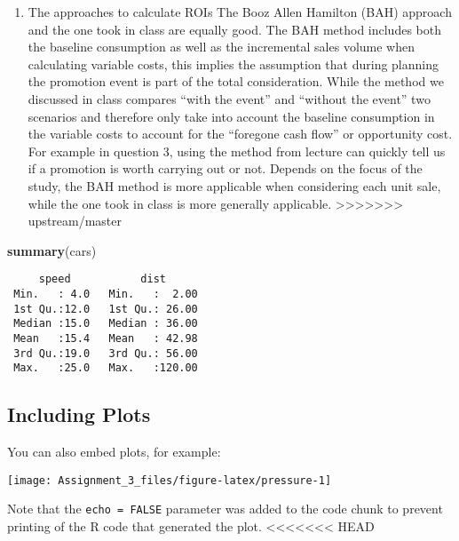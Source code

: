 \documentclass[]{article}
\newenvironment{Shaded}{\begin{snugshade}}{\end{snugshade}}
\newcommand{\KeywordTok}[1]{\textcolor[rgb]{0.13,0.29,0.53}{\textbf{#1}}}
\newcommand{\NormalTok}[1]{#1}
\providecommand{\tightlist}{%
  \setlength{\itemsep}{0pt}\setlength{\parskip}{0pt}}
\begin{document}
\begin{enumerate}
\def\labelenumi{\arabic{enumi}.}
\setcounter{enumi}{4}
\tightlist
\item
  The approaches to calculate ROIs The Booz Allen Hamilton (BAH)
  approach and the one took in class are equally good. The BAH method
  includes both the baseline consumption as well as the incremental
  sales volume when calculating variable costs, this implies the
  assumption that during planning the promotion event is part of the
  total consideration. While the method we discussed in class compares
  ``with the event'' and ``without the event'' two scenarios and
  therefore only take into account the baseline consumption in the
  variable costs to account for the ``foregone cash flow'' or
  opportunity cost. For example in question 3, using the method from
  lecture can quickly tell us if a promotion is worth carrying out or
  not. Depends on the focus of the study, the BAH method is more
  applicable when considering each unit sale, while the one took in
  class is more generally applicable.
  \textgreater{}\textgreater{}\textgreater{}\textgreater{}\textgreater{}\textgreater{}\textgreater{}
  upstream/master
\end{enumerate}

\begin{Shaded}
\begin{Highlighting}[]
\KeywordTok{summary}\NormalTok{(cars)}
\end{Highlighting}
\end{Shaded}

\begin{verbatim}
     speed           dist       
 Min.   : 4.0   Min.   :  2.00  
 1st Qu.:12.0   1st Qu.: 26.00  
 Median :15.0   Median : 36.00  
 Mean   :15.4   Mean   : 42.98  
 3rd Qu.:19.0   3rd Qu.: 56.00  
 Max.   :25.0   Max.   :120.00  
\end{verbatim}

\hypertarget{including-plots}{%
\subsection{Including Plots}\label{including-plots}}

You can also embed plots, for example:

\begin{flushright}\texttt{[image: Assignment\_3\_files/figure-latex/pressure-1]} \end{flushright}

Note that the \texttt{echo\ =\ FALSE} parameter was added to the code
chunk to prevent printing of the R code that generated the plot.
\textless{}\textless{}\textless{}\textless{}\textless{}\textless{}\textless{}
HEAD
\end{document}
